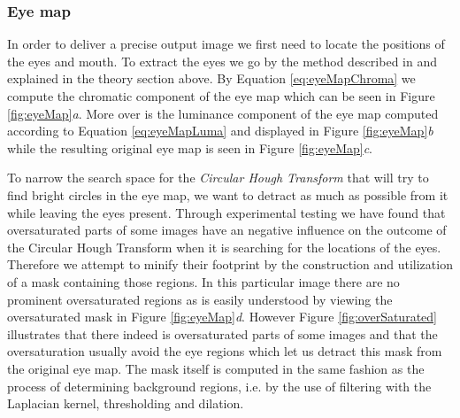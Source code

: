 \subsubsection{Eye map}

In order to deliver a precise output image we first need to locate the positions of the eyes and mouth. To extract the eyes we go by the method described in \cite{fdInColorImages} and explained in the theory section above. By Equation \ref{eq:eyeMapChroma} we compute the chromatic component of the eye map which can be seen in Figure \ref{fig:eyeMap}\textit{a}. More over is the luminance component of the eye map computed according to Equation \ref{eq:eyeMapLuma} and displayed in Figure \ref{fig:eyeMap}\textit{b} while the resulting original eye map is seen in Figure \ref{fig:eyeMap}\textit{c}.



To narrow the search space for the \textit{Circular Hough Transform} that will try to find bright circles in the eye map, we want to detract as much as possible from it while leaving the eyes present. Through experimental testing we have found that oversaturated parts of some images have an negative influence on the outcome of the Circular Hough Transform when it is searching for the locations of the eyes. Therefore we attempt to minify their footprint by the construction and utilization of a mask containing those regions. In this particular image there are no prominent oversaturated regions as is easily understood by viewing the oversaturated mask in Figure \ref{fig:eyeMap}\textit{d}. However Figure \ref{fig:overSaturated} illustrates that there indeed is oversaturated parts of some images and that the oversaturation usually avoid the eye regions which let us detract this mask from the original eye map. The mask itself is computed in the same fashion as the process of determining background regions, i.e. by the use of filtering with the Laplacian kernel, thresholding and dilation.


